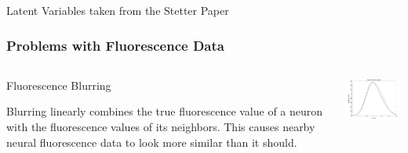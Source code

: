 \documentclass{beamer}
\begin{document}
 \begin{frame}{Latent Variables taken from the Stetter Paper}
\frametitle{Problems  with Fluorescence Data}
 \begin{columns}[T]
    \begin{column}{.5\textwidth}
   
\begin{block}{Fluorescence Blurring}
        
Blurring linearly combines the true fluorescence value of a neuron with the fluorescence values of its neighbors. This causes nearby neural fluorescence data to look more similar than it should. 
   \end{block}





  
\end{column}
    \begin{column}{60mm}
    \begin{block}{}
    \includegraphics[width=55mm]{blurred_fluorescence.jpg}
   
    \end{block}
    \end{column}
\end{columns} 




\end{frame}
\end{document}
